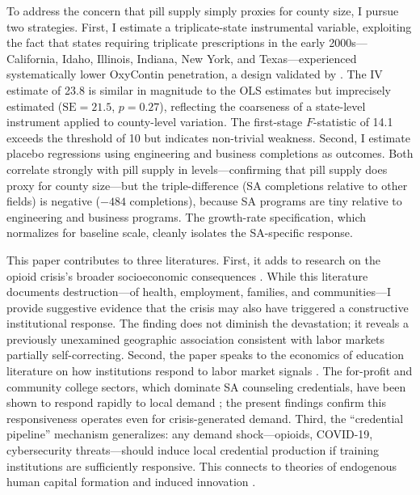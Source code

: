 \documentclass[12pt]{article}
\begin{document}
To address the concern that pill supply simply proxies for county size, I pursue two strategies. First, I estimate a triplicate-state instrumental variable, exploiting the fact that states requiring triplicate prescriptions in the early 2000s---California, Idaho, Illinois, Indiana, New York, and Texas---experienced systematically lower OxyContin penetration, a design validated by \citet{alpert2022}. The IV estimate of 23.8 is similar in magnitude to the OLS estimates but imprecisely estimated ($\text{SE} = 21.5$, $p = 0.27$), reflecting the coarseness of a state-level instrument applied to county-level variation. The first-stage $F$-statistic of 14.1 exceeds the \citet{stock2005} threshold of 10 but indicates non-trivial weakness. Second, I estimate placebo regressions using engineering and business completions as outcomes. Both correlate strongly with pill supply in levels---confirming that pill supply does proxy for county size---but the triple-difference (SA completions relative to other fields) is negative ($-484$ completions), because SA programs are tiny relative to engineering and business programs. The growth-rate specification, which normalizes for baseline scale, cleanly isolates the SA-specific response.

This paper contributes to three literatures. First, it adds to research on the opioid crisis's broader socioeconomic consequences \citep{case2015, case2020, powell2020, evans2019, ruhm2019, cutler2022, deiana2019, lin2022}. While this literature documents destruction---of health, employment, families, and communities---I provide suggestive evidence that the crisis may also have triggered a constructive institutional response. The finding does not diminish the devastation; it reveals a previously unexamined geographic association consistent with labor markets partially self-correcting. Second, the paper speaks to the economics of education literature on how institutions respond to labor market signals \citep{cellini2010, bettinger2017, turner2014, bound2010, deming2012}. The for-profit and community college sectors, which dominate SA counseling credentials, have been shown to respond rapidly to local demand \citep{cellini2010, deming2016}; the present findings confirm this responsiveness operates even for crisis-generated demand. Third, the ``credential pipeline'' mechanism generalizes: any demand shock---opioids, COVID-19, cybersecurity threats---should induce local credential production if training institutions are sufficiently responsive. This connects to theories of endogenous human capital formation \citep{becker1964, ben-porath1967, heckman2006} and induced innovation \citep{acemoglu2002}.
\end{document}
